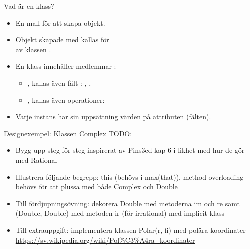 

\begin{Slide}{Vad är en klass?}
\begin{itemize} 
\item En mall för att skapa objekt.
\item Objekt skapade med  kallas för\\   av klassen .
\item En klass innehåller medlemmar : 
  \begin{itemize} 
  \item {}, kallas även fält : , ,  
  \item {}, kallas även operationer: 
  \end{itemize}
\item Varje instans har sin uppsättning värden på attributen (fälten).
\end{itemize}

\end{Slide}

\begin{Slide}{Designexempel: Klassen Complex}\small
TODO:
  \begin{itemize} 
  \item Bygg upp  steg för steg inspirerat av Pins3ed kap 6 i likhet med hur de gör med Rational
  \item Illustrera följande begrepp: this (behövs i max(that)), method overloading behövs för att plussa med både Complex och Double
  \item Till fördjupningsövning: dekorera Double med metoderna im och re samt (Double, Double) med metoden ir (för irrational) med implicit klass
  \item Till extrauppgift: implementera klassen Polar(r, fi) med polära koordinater \url{https://sv.wikipedia.org/wiki/Pol%C3%A4ra_koordinater}
  \end{itemize}
\end{Slide}


